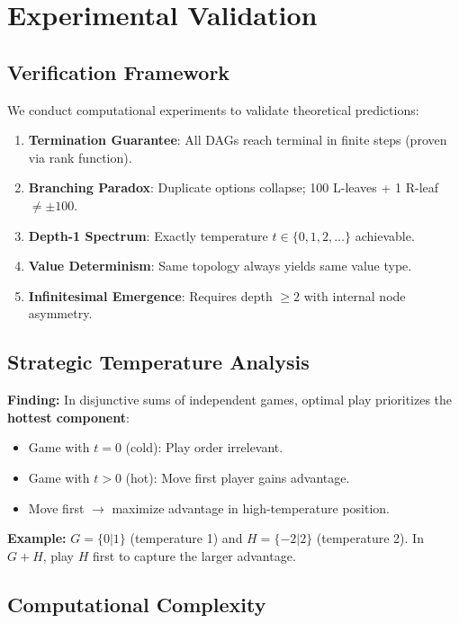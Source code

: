 \documentclass[10pt,a4paper,twocolumn]{article}
\theoremstyle{plain}
\theoremstyle{definition}
\theoremstyle{remark}
\begin{document}
\section{Experimental Validation}

\subsection{Verification Framework}

We conduct computational experiments to validate theoretical predictions:

\begin{enumerate}
\item \textbf{Termination Guarantee}: All DAGs reach terminal in finite steps (proven via rank function).
\item \textbf{Branching Paradox}: Duplicate options collapse; 100 L-leaves + 1 R-leaf $\neq \pm 100$.
\item \textbf{Depth-1 Spectrum}: Exactly temperature $t \in \{0, 1, 2, \ldots\}$ achievable.
\item \textbf{Value Determinism}: Same topology always yields same value type.
\item \textbf{Infinitesimal Emergence}: Requires depth $\geq 2$ with internal node asymmetry.
\end{enumerate}

\subsection{Strategic Temperature Analysis}

\textbf{Finding:} In disjunctive sums of independent games, optimal play prioritizes the \textbf{hottest component}:

\begin{itemize}
\item Game with $t=0$ (cold): Play order irrelevant.
\item Game with $t>0$ (hot): Move first player gains advantage.
\item Move first $\to$ maximize advantage in high-temperature position.
\end{itemize}

\textbf{Example:} $G = \{0|1\}$ (temperature 1) and $H = \{-2|2\}$ (temperature 2). In $G + H$, play $H$ first to capture the larger advantage.

\subsection{Computational Complexity}
\end{document}
